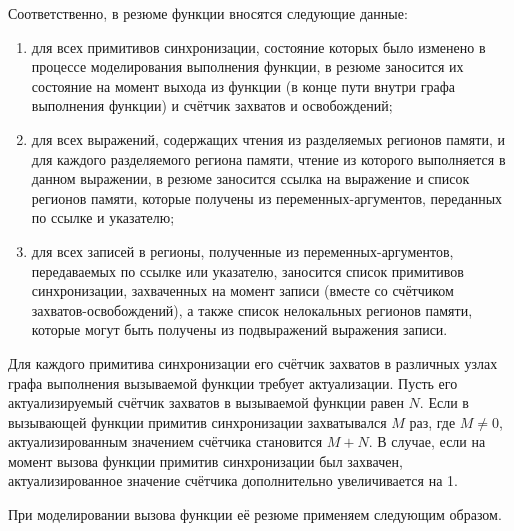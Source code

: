 Соответственно, в резюме функции вносятся следующие данные:

\begin{enumerate}
 \item для всех примитивов синхронизации, состояние которых было изменено в процессе моделирования выполнения функции, в резюме заносится их состояние на момент выхода из функции (в конце пути внутри графа выполнения функции) и счётчик захватов и освобождений;
 \item для всех выражений, содержащих чтения из разделяемых регионов памяти, и для каждого разделяемого региона памяти, чтение из которого выполняется в данном выражении, в резюме заносится ссылка на выражение и список регионов памяти, которые получены из переменных-аргументов, переданных по ссылке и указателю;
 \item для всех записей в регионы, полученные из переменных-аргументов, передаваемых по ссылке или указателю, заносится список примитивов синхронизации, захваченных на момент записи (вместе со счётчиком захватов-освобождений), а также список нелокальных регионов памяти, которые могут быть получены из подвыражений выражения записи.
\end{enumerate}

Для каждого примитива синхронизации его счётчик захватов в различных узлах графа выполнения вызываемой функции требует актуализации. Пусть его актуализируемый счётчик захватов в вызываемой функции равен $N$. Если в вызывающей функции примитив синхронизации захватывался $M$ раз, где $M \neq 0$, актуализированным значением счётчика становится $M + N$. В случае, если на момент вызова функции примитив синхронизации был захвачен, актуализированное значение счётчика дополнительно увеличивается на 1.

При моделировании вызова функции её резюме применяем следующим образом.

